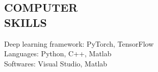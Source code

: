 \documentclass[margin]{res}
\begin{document}
\begin{resume}
\section{COMPUTER \\ SKILLS} 
Deep learning framework: PyTorch, TensorFlow\\
Languages: Python, C++, Matlab \\
Softwares: Visual Studio, Matlab 


\end{resume}
\end{document}
